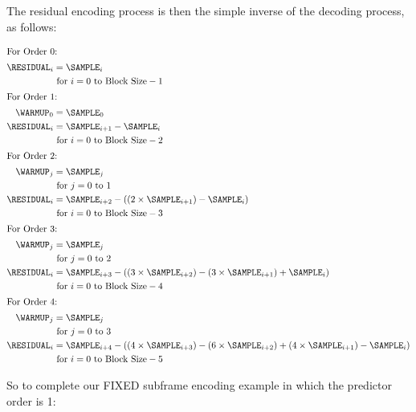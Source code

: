 \clearpage

The residual encoding process is then the simple inverse of the
decoding process, as follows:

\begin{align*}
\intertext{For Order 0:}
\RESIDUAL_i &= \SAMPLE_i \\
& \text{ for } i = 0 \text{ to Block Size} - 1 \\
\intertext{For Order 1:}
\WARMUP_0 &= \SAMPLE_0 \\
\RESIDUAL_i &= \SAMPLE_{i + 1} - \SAMPLE_i \\
& \text{ for } i = 0 \text{ to Block Size} - 2 \\
\intertext{For Order 2:}
\WARMUP_j &= \SAMPLE_j \\
& \text{ for } j = 0 \text{ to } 1 \\
\RESIDUAL_i &= \SAMPLE_{i + 2} - ((2 \times \SAMPLE_{i + 1}) - \SAMPLE_i) \\
& \text{ for } i = 0 \text{ to Block Size} - 3 \\
\intertext{For Order 3:}
\WARMUP_j &= \SAMPLE_j \\
& \text{ for } j = 0 \text{ to } 2 \\
\RESIDUAL_i &= \SAMPLE_{i + 3} - ((3 \times \SAMPLE_{i + 2}) - (3 \times \SAMPLE_{i + 1}) + \SAMPLE_i) \\
& \text{ for } i = 0 \text{ to Block Size} - 4 \\
\intertext{For Order 4:}
\WARMUP_j &= \SAMPLE_j \\
& \text{ for } j = 0 \text{ to } 3 \\
\RESIDUAL_i &= \SAMPLE_{i + 4} - ((4 \times \SAMPLE_{i + 3}) - (6 \times \SAMPLE_{i + 2}) + (4 \times \SAMPLE_{i + 1}) - \SAMPLE_i) \\
& \text{ for } i = 0 \text{ to Block Size} - 5 \\
\end{align*}

\clearpage

So to complete our FIXED subframe encoding example in which the
predictor order is 1:


